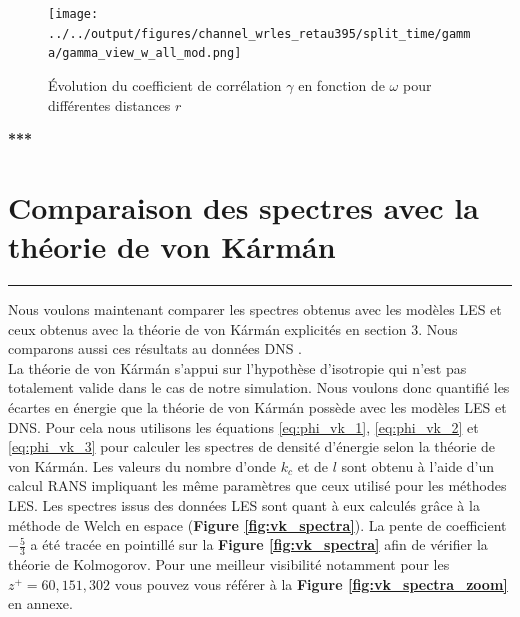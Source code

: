 \documentclass[12pt]{article}
\theoremstyle{plain}
\theoremstyle{remark}
\begin{document}
\begin{figure}[H]
	\begin{center}
		\texttt{[image: ../../output/figures/channel\_wrles\_retau395/split\_time/gamma/gamma\_view\_w\_all\_mod.png]}
		\caption{Évolution du coefficient de corrélation $\gamma$ en fonction de $\omega$ pour différentes distances $r$}
		\label{fig:gamma_w_view}
	\end{center}
\end{figure}


\begin{center}
	\large \bf{***}
\end{center}




\vspace{0.3cm}
\section{Comparaison des spectres avec la théorie de von Kármán}
\noindent\rule{\linewidth}{2pt}
\vspace{0.1cm}

Nous voulons maintenant comparer les spectres obtenus avec les modèles LES et ceux obtenus avec la théorie de von Kármán explicités en section 3. Nous comparons aussi ces résultats au données DNS \cite{lee2015direct}. \\
La théorie de von Kármán s'appui sur l'hypothèse d'isotropie qui n'est pas totalement valide dans le cas de notre simulation. Nous voulons donc quantifié les écartes en énergie que la théorie de von Kármán possède avec les modèles LES et DNS. Pour cela nous utilisons les équations \ref{eq:phi_vk_1}, \ref{eq:phi_vk_2} et \ref{eq:phi_vk_3} pour calculer les spectres de densité d'énergie selon la théorie de von Kármán. Les valeurs du nombre d'onde $k_c$ et de $l$ sont obtenu à l'aide d'un calcul RANS impliquant les même paramètres que ceux utilisé pour les méthodes LES. Les spectres issus des données LES sont quant à eux calculés grâce à la méthode de Welch en espace ({\bf Figure \ref{fig:vk_spectra}}). La pente de coefficient $-\frac{5}{3}$ a été tracée en pointillé sur la \textbf{Figure \ref{fig:vk_spectra}} afin de vérifier la théorie de Kolmogorov. Pour une meilleur visibilité notamment pour les $z^+=60, 151, 302$ vous pouvez vous référer à la \textbf{Figure \ref{fig:vk_spectra_zoom}} en annexe. \\
\end{document}
